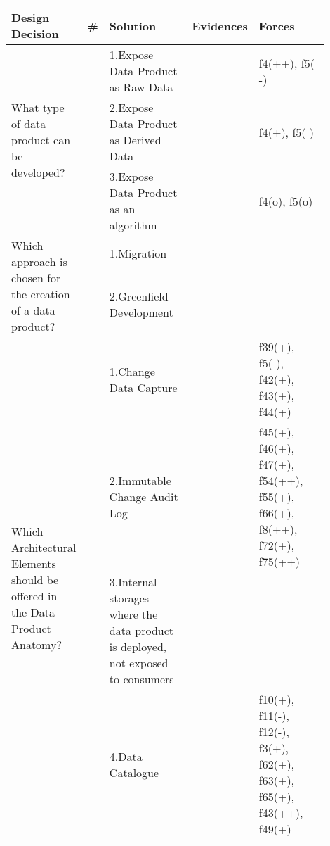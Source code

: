 \begin{tabular}{|p{0.12\linewidth}|p{0.015\linewidth}|p{0.3\linewidth}|p{0.15\linewidth}|p{0.31\linewidth}|}
\hline
{\bf Design Decision} & {\bf \#} & {\bf Solution} & {\bf Evidences} & {\bf Forces}\\
\hline
\multirow{3}{\linewidth}{What type of data product can be developed?} &\cellcolor{emerald_shape_3}{} &1.Expose Data Product as Raw Data&\cellcolor{emerald_shape_7}{s1, s2, s6, s7, s9, s14, s15, s27, s34, s43} & f4(++), f5(-{}-)\\
 & \cellcolor{emerald_shape_3}{} & 2.Expose Data Product as Derived Data&\cellcolor{emerald_shape_7}{s1, s2, s6, s9, s14, s15, s27, s34} & f4(+), f5(-)\\
 & \multirow{-3}{\linewidth}{ \cellcolor{emerald_shape_3}{10}} &3.Expose Data Product as an algorithm&\cellcolor{emerald_shape_4}{s2, s6} & f4(o), f5(o)\\
\multirow{2}{\linewidth}{Which approach is chosen for the creation of a data product?} &\cellcolor{emerald_shape_6}{} &1.Migration&\cellcolor{emerald_shape_5}{s7, s8, s9, s23, s38, s39, s41, s43, s44, s45, s48, s56, s57} & \\
 & \multirow{-2}{\linewidth}{ \cellcolor{emerald_shape_6}{34}} &2.Greenfield Development&\cellcolor{emerald_shape_7}{s1, s2, s3, s5, s6, s7, s8, s9, s11, s14, s15, s18, s20, s23, s25, s28, s30, s31, s32, s33, s35, s37, s38, s39, s40, s41, s42, s43, s45, s49} & \\
\multirow{4}{\linewidth}{Which Architectural Elements should be offered in the Data Product Anatomy?} &\cellcolor{emerald_shape_6}{} &1.Change Data Capture&\cellcolor{emerald_shape_4}{s4, s17, s20, s38, s45, s48, s53, s54, s55, s56} & f39(+), f5(-), f42(+), f43(+), f44(+)\\
 & \cellcolor{emerald_shape_6}{} & 2.Immutable Change Audit Log&\cellcolor{emerald_shape_5}{s4, s8, s12, s31, s32, s35, s36, s45, s47, s48, s53, s54, s55, s56, s57} & f45(+), f46(+), f47(+), f54(++), f55(+), f66(+), f8(++), f72(+), f75(++)\\
 & \cellcolor{emerald_shape_6}{} & 3.Internal storages where the data product is deployed, not exposed to consumers&\cellcolor{emerald_shape_4}{s4, s13, s15, s32, s33, s36, s49} & \\
 & \multirow{-4}{\linewidth}{ \cellcolor{emerald_shape_6}{34}} &4.Data Catalogue&\cellcolor{emerald_shape_6}{s1, s3, s5, s7, s9, s15, s16, s25, s30, s31, s32, s37, s43, s47, s48, s53, s55} & f10(+), f11(-), f12(-), f3(+), f62(+), f63(+), f65(+), f43(++), f49(+)\\

\end{tabular}
